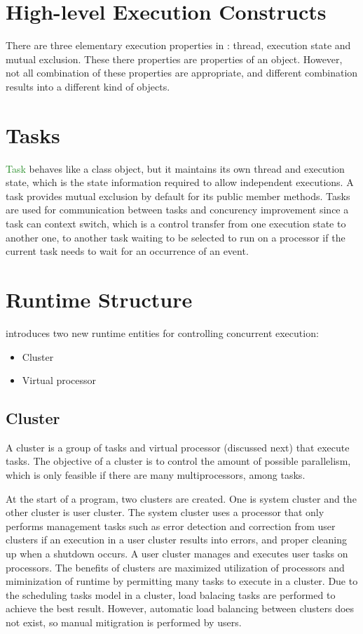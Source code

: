\section{High-level Execution Constructs}
There are three elementary execution properties in \uCPP: thread, execution
state and mutual exclusion. These there properties are properties of an object. However, not all
combination of these properties are appropriate, and different combination
results into a different kind of objects.
\fi

\section{Tasks}
\textcolor{ForestGreen}{Task} behaves like a class object, but it maintains its own
thread and execution state, which is the state information required to allow
independent executions. A task provides mutual exclusion by default for its
public member methods. Tasks are used for communication between tasks and
concurency improvement since a task can context switch, which is a control transfer from
one execution state to another one, to another task waiting to be selected to
run on a processor if the current task needs to wait for an occurrence of an
event.

\section{\uCPPS Runtime Structure}
\uCPPS introduces two new runtime entities for controlling concurrent execution:
\begin{itemize}
    \item Cluster
    \item Virtual processor
\end{itemize}

\subsection{Cluster}
A cluster is a group of tasks and virtual processor (discussed next) that
execute tasks. The objective of a cluster is to control the amount of possible
parallelism, which is only feasible if there are many multiprocessors, among tasks.

At the start of a \uCPPS program, two clusters are created. One is system
cluster and the other cluster is user cluster. The system cluster uses a
processor that only performs management tasks such as error detection and
correction from user clusters if an execution in a user cluster results into
errors, and proper cleaning up when a shutdown occurs. A user cluster manages and executes user tasks on processors. The benefits of clusters
are maximized utilization of processors and miminization of runtime by
permitting many tasks to execute in a cluster. Due to the scheduling tasks model
in a cluster, load balacing tasks are performed to achieve the best result.
However, automatic load balancing between clusters does not exist, so manual
mitigration is performed by users.

